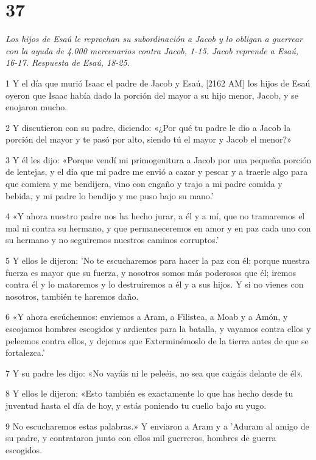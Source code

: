 \chapter{37}

\par \textit{Los hijos de Esaú le reprochan su subordinación a Jacob y lo obligan a guerrear con la ayuda de 4.000 mercenarios contra Jacob, 1-15. Jacob reprende a Esaú, 16-17. Respuesta de Esaú, 18-25.}

\par 1 Y el día que murió Isaac el padre de Jacob y Esaú, [2162 AM] los hijos de Esaú oyeron que Isaac había dado la porción del mayor a su hijo menor, Jacob, y se enojaron mucho.
\par 2 Y discutieron con su padre, diciendo: «¿Por qué tu padre le dio a Jacob la porción del mayor y te pasó por alto, siendo tú el mayor y Jacob el menor?»
\par 3 Y él les dijo: «Porque vendí mi primogenitura a Jacob por una pequeña porción de lentejas, y el día que mi padre me envió a cazar y pescar y a traerle algo para que comiera y me bendijera, vino con engaño y trajo a mi padre comida y bebida, y mi padre lo bendijo y me puso bajo su mano.'
\par 4 «Y ahora nuestro padre nos ha hecho jurar, a él y a mí, que no tramaremos el mal ni contra su hermano, y que permaneceremos en amor y en paz cada uno con su hermano y no seguiremos nuestros caminos corruptos.'
\par 5 Y ellos le dijeron: 'No te escucharemos para hacer la paz con él; porque nuestra fuerza es mayor que su fuerza, y nosotros somos más poderosos que él; iremos contra él y lo mataremos y lo destruiremos a él y a sus hijos. Y si no vienes con nosotros, también te haremos daño.
\par 6 «Y ahora escúchennos: enviemos a Aram, a Filistea, a Moab y a Amón, y escojamos hombres escogidos y ardientes para la batalla, y vayamos contra ellos y peleemos contra ellos, y dejemos que Exterminémoslo de la tierra antes de que se fortalezca.'
\par 7 Y su padre les dijo: «No vayáis ni le peleéis, no sea que caigáis delante de él».
\par 8 Y ellos le dijeron: «Esto también es exactamente lo que has hecho desde tu juventud hasta el día de hoy, y estás poniendo tu cuello bajo su yugo.
\par 9 No escucharemos estas palabras.» Y enviaron a Aram y a 'Aduram al amigo de su padre, y contrataron junto con ellos mil guerreros, hombres de guerra escogidos.
